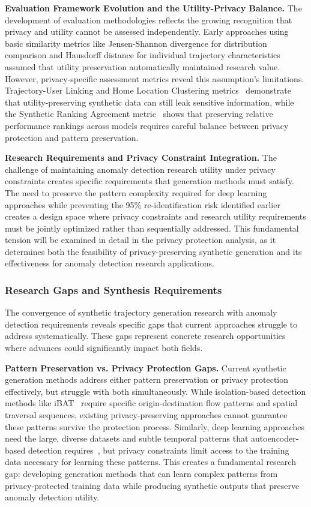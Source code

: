 \documentclass[runningheads]{llncs}
\begin{document}
\textbf{Evaluation Framework Evolution and the Utility-Privacy Balance.} The development of evaluation methodologies reflects the growing recognition that privacy and utility cannot be assessed independently. Early approaches using basic similarity metrics like Jensen-Shannon divergence for distribution comparison and Hausdorff distance for individual trajectory characteristics~\cite{kong2023mobility} assumed that utility preservation automatically maintained research value. However, privacy-specific assessment metrics reveal this assumption's limitations. Trajectory-User Linking and Home Location Clustering metrics~\cite{rao2023cats} demonstrate that utility-preserving synthetic data can still leak sensitive information, while the Synthetic Ranking Agreement metric~\cite{jordon2019pate} shows that preserving relative performance rankings across models requires careful balance between privacy protection and pattern preservation.

\textbf{Research Requirements and Privacy Constraint Integration.} The challenge of maintaining anomaly detection research utility under privacy constraints creates specific requirements that generation methods must satisfy. The need to preserve the pattern complexity required for deep learning approaches while preventing the 95\% re-identification risk identified earlier creates a design space where privacy constraints and research utility requirements must be jointly optimized rather than sequentially addressed. This fundamental tension will be examined in detail in the privacy protection analysis, as it determines both the feasibility of privacy-preserving synthetic generation and its effectiveness for anomaly detection research applications.

\subsubsection{Research Gaps and Synthesis Requirements}

The convergence of synthetic trajectory generation research with anomaly detection requirements reveals specific gaps that current approaches struggle to address systematically. These gaps represent concrete research opportunities where advances could significantly impact both fields.

\textbf{Pattern Preservation vs. Privacy Protection Gaps.} Current synthetic generation methods address either pattern preservation or privacy protection effectively, but struggle with both simultaneously. While isolation-based detection methods like iBAT~\cite{zhang2019ibat} require specific origin-destination flow patterns and spatial traversal sequences, existing privacy-preserving approaches cannot guarantee these patterns survive the protection process. Similarly, deep learning approaches need the large, diverse datasets and subtle temporal patterns that autoencoder-based detection requires~\cite{huang2021lstm}, but privacy constraints limit access to the training data necessary for learning these patterns. This creates a fundamental research gap: developing generation methods that can learn complex patterns from privacy-protected training data while producing synthetic outputs that preserve anomaly detection utility.
\end{document}
